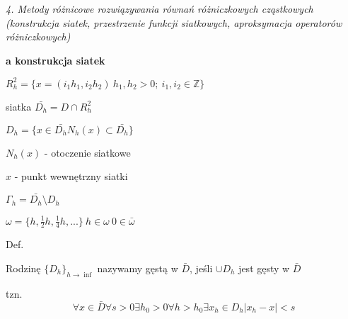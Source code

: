 \textit{4. Metody różnicowe rozwiązywania równań różniczkowych cząstkowych (konstrukcja siatek, przestrzenie funkcji siatkowych, aproksymacja operatorów różniczkowych)}

\textbf{a\) konstrukcja siatek}

$R^{2}_{h} = \{ x = (i_{1}h_{1}, i_{2}h_{2})\ h_{1},h_{2} > 0;\ i_{1},i_{2} \in \mathbb{Z}\}$

siatka $\bar{D_{h}} = D \cap R^{2}_{h}$

$D_{h} = \{ x \in \bar{D_{h}} N_h(x) \subset \bar{D_{h}}\}$

$N_h(x)$ - otoczenie siatkowe

$x$ - punkt wewnętrzny siatki

$\Gamma_h = \bar{D_h} \setminus D_h$

$\omega = \{h, \frac{1}{2}h, \frac{1}{4}h, ...\}\ h \in \omega\ 0 \in \bar{\omega}$

Def.

Rodzinę $\{D_h\}_{h \rightarrow \inf}$ nazywamy gęstą w $\bar{D}$, jeśli $\cup D_h$ jest gęsty w $\bar{D}$

tzn.
\[\forall x \in \bar{D} \forall s > 0 \exists h_0 > 0 \forall h > h_0 \exists x_h \in D_h |x_h - x| < s\]
